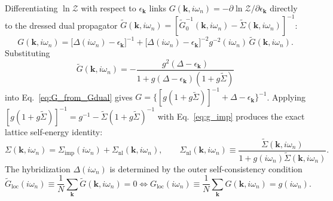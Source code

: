 \documentclass[11pt,a4paper]{article}
\numberwithin{equation}{section}
\theoremstyle{plain}
\theoremstyle{definition}
\providecommand{\vk}{\mathbf{k}}
\begin{document}
Differentiating $\ln\mathcal{Z}$ with respect to $\epsilon_{\vk}$ links
$G(\vk,i\omega_n) = -\partial\ln\mathcal{Z}/\partial\epsilon_{\vk}$ directly to the
dressed dual propagator
$\tilde{G}(\vk,i\omega_n) = [\tilde{G}_0^{-1}(\vk,i\omega_n) - \tilde{\Sigma}(\vk,i\omega_n)]^{-1}$:
\begin{equation}
    G(\vk,i\omega_n)
    = \bigl[\Delta(i\omega_n) - \epsilon_{\vk}\bigr]^{-1}
      + \bigl[\Delta(i\omega_n) - \epsilon_{\vk}\bigr]^{-2}
        g^{-2}(i\omega_n)\, \tilde{G}(\vk,i\omega_n).
    \label{eq:G_from_Gdual}
\end{equation}
Substituting
\begin{equation}
    \tilde{G}(\vk,i\omega_n)
    = -\frac{g^2 (\Delta - \epsilon_{\vk})}
            {1 + g(\Delta - \epsilon_{\vk})(1 + g\tilde{\Sigma})}
    \label{eq:Gdual_dressed}
\end{equation}
into Eq.~\eqref{eq:G_from_Gdual} gives
$G = \bigl\{[g(1 + g\tilde{\Sigma})]^{-1} + \Delta - \epsilon_{\vk}\bigr\}^{-1}$.
Applying $[g(1+g\tilde{\Sigma})]^{-1} = g^{-1} - \tilde{\Sigma}(1+g\tilde{\Sigma})^{-1}$
with Eq.~\eqref{eq:g_imp} produces the exact lattice self-energy identity:
\begin{equation}
    \Sigma(\vk,i\omega_n)
    = \Sigma_{\mathrm{imp}}(i\omega_n) + \Sigma_{\mathrm{nl}}(\vk,i\omega_n),
    \qquad
    \Sigma_{\mathrm{nl}}(\vk,i\omega_n)
    \equiv \frac{\tilde{\Sigma}(\vk,i\omega_n)}{1 + g(i\omega_n)\tilde{\Sigma}(\vk,i\omega_n)}.
    \label{eq:Sigma_exact}
\end{equation}
The hybridization $\Delta(i\omega_n)$ is determined by the outer self-consistency
condition
\begin{equation}
    \tilde{G}_{\mathrm{loc}}(i\omega_n) \equiv \frac{1}{N}\sum_{\vk} \tilde{G}(\vk,i\omega_n) = 0
    \iff
    G_{\mathrm{loc}}(i\omega_n) \equiv \frac{1}{N}\sum_{\vk} G(\vk,i\omega_n) = g(i\omega_n).
    \label{eq:outer_sc}
\end{equation}
\end{document}

